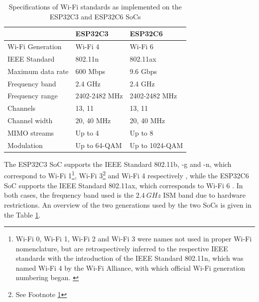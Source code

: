 \begin{table}[H]
    \centering
    \begin{tabular}{|l|l|l|}
        \hline
        & \textbf{ESP32C3} & \textbf{ESP32C6} \\\hline
        Wi-Fi Generation & Wi-Fi 4 & Wi-Fi 6 \\\hline
        IEEE Standard & 802.11n & 802.11ax \\\hline
        Maximum data rate & 600 Mbps & 9.6 Gbps \\\hline
        Frequency band & 2.4 GHz & 2.4 GHz \\\hline
        Frequency range & 2402-2482 MHz & 2402-2482 MHz \\\hline
        Channels & 13, 11 & 13, 11 \\\hline
        Channel width & 20, 40 MHz & 20, 40 MHz \\\hline
        MIMO streams & Up to 4 & Up to 8 \\\hline
        Modulation & Up to 64-QAM & Up to 1024-QAM \\\hline
    \end{tabular}
    \vspace{\ftspace}
    \caption{Specifications of Wi-Fi standards as implemented on the ESP32C3 and ESP32C6 SoCs \citep{noauthor_ieee_2009, noauthor_ieee_2021}}
    \label{tab:esp_wifi}
\end{table}

The ESP32C3 SoC supports the IEEE Standard 802.11b, -g and -n, which correspond to Wi-Fi 1\footnote{\label{note:wifi_name}Wi-Fi 0, Wi-Fi 1, Wi-Fi 2 and Wi-Fi 3 were names not used in proper Wi-Fi nomenclature, but are retrospectively inferred to the respective IEEE standards with the introduction of the IEEE Standard 802.11n, which was named Wi-Fi 4 by the Wi-Fi Alliance, with which official Wi-Fi generation numbering began. \citep{wi-fi_alliance_generational_2023}}, Wi-Fi 3\footnote{See Footnote \ref{note:wifi_name}} and Wi-Fi 4 respectively \citep{seeed_studio_seeed_2024-2, espressif_systems_esp32-c3_2024, wi-fi_alliance_generational_2023, noauthor_ieee_2000,noauthor_ieee_2003, noauthor_ieee_2009}, while the ESP32C6 SoC supports the IEEE Standard 802.11ax, which corresponds to Wi-Fi 6 \citep{seeed_studio_seeed_2024-1, espressif_systems_esp32-c6_2024, wi-fi_alliance_generational_2023, noauthor_ieee_2021}. In both cases, the frequency band used is the $2.4\ GHz$ ISM band due to hardware restrictions. An overview of the two generations used by the two SoCs is given in the Table \ref{tab:esp_wifi}.\\

